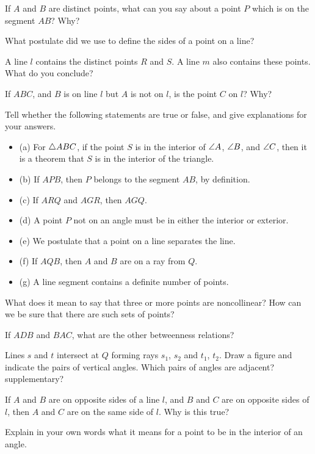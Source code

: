 \documentclass[11pt]{book}
\theoremstyle{bkplain}
\begin{document}
\begin{exlist}
\item If $A$ and $B$ are distinct points, what can you say about a point $P$
      which is on the segment $AB$? Why?
\item What postulate did we use to define the sides of a point on a line?
\item A line $l$ contains the distinct points $R$ and $S$. A line $m$ also
      contains these points. What do you conclude?
\item If $ABC$, and $B$ is on line $l$ but $A$ is not on $l$, is the point $C$ on
      $l$? Why?
\item Tell whether the following statements are true or false, and give
      explanations for your answers.
      \begin{itemize}[label=,leftmargin=1.4em,itemsep=1pt,topsep=2pt]
      \item (a) For $\triangle ABC$, if the point $S$ is in the interior of $\angle A$,
            $\angle B$, and $\angle C$, then it is a theorem that $S$ is in the
            interior of the triangle.
      \item (b) If $APB$, then $P$ belongs to the segment $AB$, by definition.
      \item (c) If $ARQ$ and $AGR$, then $AGQ$.
      \item (d) A point $P$ not on an angle must be in either the interior or
            exterior.
      \item (e) We postulate that a point on a line separates the line.
      \item (f) If $AQB$, then $A$ and $B$ are on a ray from $Q$.
      \item (g) A line segment contains a definite number of points.
      \end{itemize}
\item What does it mean to say that three or more points are noncollinear? How
      can we be sure that there are such sets of points?
\item If $ADB$ and $BAC$, what are the other betweenness relations?
\item Lines $s$ and $t$ intersect at $Q$ forming rays $s_1$, $s_2$ and $t_1$,
      $t_2$. Draw a figure and indicate the pairs of vertical angles. Which pairs
      of angles are adjacent? supplementary?
\item If $A$ and $B$ are on opposite sides of a line $l$, and $B$ and $C$ are on
      opposite sides of $l$, then $A$ and $C$ are on the same side of $l$. Why is
      this true?
\item Explain in your own words what it means for a point to be in the interior
      of an angle.
\end{exlist}
\end{document}
